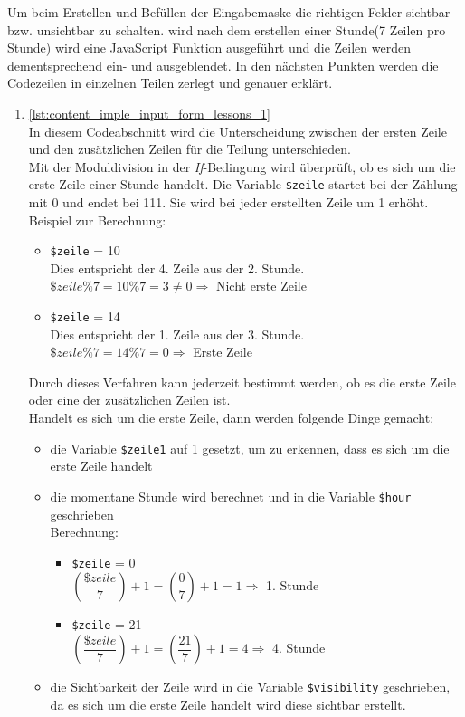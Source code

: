 Um beim Erstellen und Befüllen der Eingabemaske die richtigen Felder sichtbar bzw. unsichtbar zu schalten. wird nach dem erstellen einer Stunde(7 Zeilen pro Stunde) wird eine JavaScript Funktion ausgeführt und die Zeilen werden dementsprechend ein- und ausgeblendet.
In den nächsten Punkten werden die Codezeilen in einzelnen Teilen zerlegt und genauer erklärt.
\begin{enumerate}

	\item \autoref{lst:content_imple_input_form_lessons_1}\\
	In diesem Codeabschnitt wird die Unterscheidung zwischen der ersten Zeile und den zusätzlichen Zeilen für die Teilung unterschieden.\\
	Mit der Moduldivision in der \textit{If}-Bedingung wird überprüft, ob es sich um die erste Zeile einer Stunde handelt. Die Variable \texttt{\$zeile} startet bei der Zählung mit 0 und endet bei 111. Sie wird bei jeder erstellten Zeile um 1 erhöht.\\
	Beispiel zur Berechnung:
	
	\begin{itemize}
		\item \texttt{\$zeile} = 10\\
		Dies entspricht der 4. Zeile aus der 2. Stunde.\\
		$ \$zeile \% 7 = 10 \% 7 = 3 \ne 0 \Rightarrow $ Nicht erste Zeile
		\item \texttt{\$zeile} = 14\\
		Dies entspricht der 1. Zeile aus der 3. Stunde.\\
		$ \$zeile \% 7 = 14 \% 7 = 0 \Rightarrow $ Erste Zeile
	\end{itemize}
	
	Durch dieses Verfahren kann jederzeit bestimmt werden, ob es die erste Zeile oder eine der zusätzlichen Zeilen ist.\\
	Handelt es sich um die erste Zeile, dann werden folgende Dinge gemacht:
	
	\begin{itemize}
		\item die Variable \texttt{\$zeile1} auf 1 gesetzt, um zu erkennen, dass es sich um die erste Zeile handelt
		\item die momentane Stunde wird berechnet und in die Variable \texttt{\$hour} geschrieben\\
		Berechnung:
		\begin{itemize}
			\item \texttt{\$zeile} = 0\\
			$ ( \dfrac{\$zeile}{7} ) + 1 = ( \dfrac{0}{7} ) + 1 = 1 \Rightarrow $ 1. Stunde
			\item \texttt{\$zeile} = 21\\
			$ (\dfrac{\$zeile}{7}) + 1 = ( \dfrac{21}{7} ) + 1 = 4 \Rightarrow $ 4. Stunde\\
		\end{itemize}
		\item die Sichtbarkeit der Zeile wird in die Variable \texttt{\$visibility} geschrieben, da es sich um die erste Zeile handelt wird diese sichtbar erstellt.
	\end{itemize}
	

\end{enumerate}
